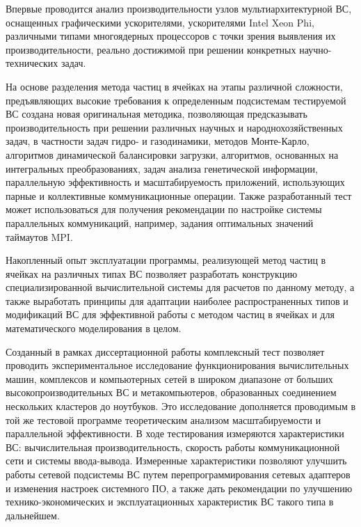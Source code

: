 Впервые проводится анализ производительности узлов мультиархитектурной ВС, оснащенных графическими ускорителями, ускорителями Intel Xeon Phi, различными типами многоядерных процессоров с точки зрения выявления их производительности, реально достижимой при решении конкретных научно-технических задач.

На основе разделения метода частиц в ячейках на этапы различной сложности, предъявляющих высокие требования к определенным подсистемам тестируемой ВС создана новая оригинальная методика, позволяющая предсказывать производительность при решении различных научных и народнохозяйственных задач, в частности задач гидро- и газодинамики, методов Монте-Карло, алгоритмов динамической балансировки загрузки, алгоритмов, основанных на интегральных преобразованиях, задач анализа генетической информации, параллельную эффективность и масштабируемость приложений, использующих парные и коллективные коммуникационные операции. Также разработанный тест может использоваться для получения рекомендации по настройке системы параллельных коммуникаций, например, задания оптимальных значений таймаутов MPI.


{\influence} Накопленный опыт эксплуатации программы, реализующей метод частиц в ячейках на различных типах ВС позволяет разработать конструкцию специализированной вычислительной системы для расчетов по данному методу, а также выработать принципы для адаптации наиболее распространенных типов и модификаций ВС для эффективной работы с методом частиц в ячейках и для математического моделирования в целом.

Созданный в рамках диссертационной работы комплексный тест позволяет проводить экспериментальное исследование функционирования вычислительных машин, комплексов и компьютерных сетей в широком диапазоне от больших высокопроизводительных ВС и метакомпьютеров, образованных соединением нескольких кластеров до ноутбуков. Это исследование дополняется проводимым в той же тестовой программе теоретическим анализом масштабируемости и параллельной эффективности. В ходе тестирования измеряются характеристики ВС: вычислительная производительность, скорость работы коммуникационной сети и системы ввода-вывода. Измеренные характеристики позволяют улучшить работы сетевой подсистемы ВС путем перепрограммирования сетевых адаптеров и изменения настроек системного ПО, а также дать рекомендации по улучшению технико-экономических и эксплуатационных характеристик ВС такого типа в дальнейшем.


